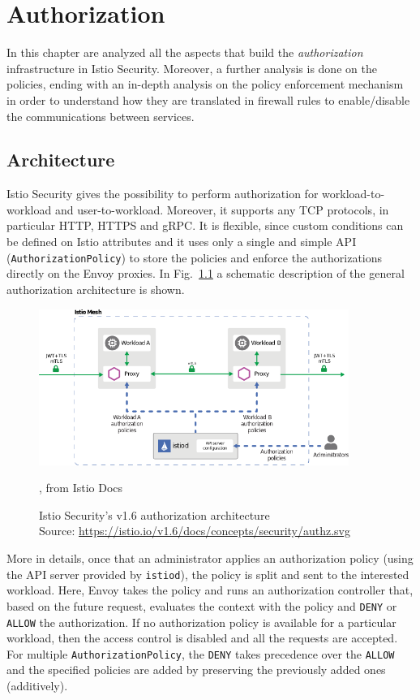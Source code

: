 \chapter{Authorization}
In this chapter are analyzed all the aspects that build the \textit{authorization} infrastructure in Istio Security. Moreover, a further analysis is done on the policies, ending with an in-depth analysis on the policy enforcement mechanism in order to understand how they are translated in firewall rules to enable/disable the communications between services.
\minitoc

\section{Architecture}
Istio Security gives the possibility to perform authorization for workload-to-workload and user-to-workload. Moreover, it supports any TCP protocols, in particular HTTP, HTTPS and gRPC. It is flexible, since custom conditions can be defined on Istio attributes and it uses only a single and simple API (\texttt{AuthorizationPolicy}) to store the policies and enforce the authorizations directly on the Envoy proxies.
In Fig.~\ref{fig:archauthz} a schematic description of the general authorization architecture is shown.

\begin{figure}[ht]
    \centering
    \includegraphics[width=0.9\textwidth]{chapters/images/chp3/arch-authz.png}
    \caption{, from Istio Docs}
    \caption[Istio Security's v1.6 authorization architecture]{Istio Security's v1.6 authorization architecture\\Source: \url{https://istio.io/v1.6/docs/concepts/security/authz.svg}}
    \label{fig:archauthz}
\end{figure}

More in details, once that an administrator applies an authorization policy (using the API server provided by \texttt{istiod}), the policy is split and sent to the interested workload. Here, Envoy takes the policy and runs an authorization controller that, based on the future request, evaluates the context with the policy and \texttt{DENY} or \texttt{ALLOW} the authorization. If no authorization policy is available for a particular workload, then the access control is disabled and all the requests are accepted. For multiple \texttt{AuthorizationPolicy}, the \texttt{DENY} takes precedence over the \texttt{ALLOW} and the specified policies are added by preserving the previously added ones (additively).

